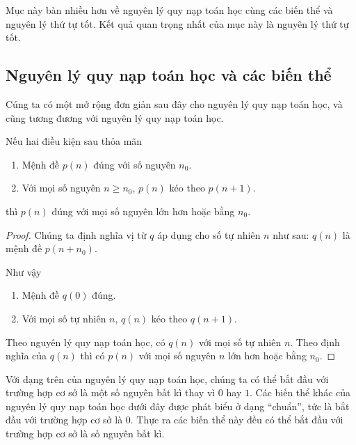 Mục này bàn nhiều hơn về nguyên lý quy nạp toán học cùng các biến thể và nguyên lý thứ tự tốt. Kết quả quan trọng nhất của mục này là nguyên lý thứ tự tốt.

\subsection{Nguyên lý quy nạp toán học và các biến thể}

Cúng ta có một mở rộng đơn giản sau đây cho nguyên lý quy nạp toán học, và cũng tương đương với nguyên lý quy nạp toán học.

\begin{theorem}
    Nếu hai điều kiện sau thỏa mãn
    \begin{enumerate}[label={(\roman*)}]
        \item Mệnh đề $p(n)$ đúng với số nguyên $n_{0}$.
        \item Với mọi số nguyên $n\geq n_{0}$, $p(n)$ kéo theo $p(n + 1)$.
    \end{enumerate}

    thì $p(n)$ đúng với mọi số nguyên lớn hơn hoặc bằng $n_{0}$.
\end{theorem}

\begin{proof}
    Chúng ta định nghĩa vị từ $q$ áp dụng cho số tự nhiên $n$ như sau: $q(n)$ là mệnh đề $p(n + n_{0})$.

    Như vậy
    \begin{enumerate}[label={(\roman*)}]
        \item Mệnh đề $q(0)$ đúng.
        \item Với mọi số tự nhiên $n$, $q(n)$ kéo theo $q(n + 1)$.
    \end{enumerate}

    Theo nguyên lý quy nạp toán học, có $q(n)$ với mọi số tự nhiên $n$. Theo định nghĩa của $q(n)$ thì có $p(n)$ với mọi số nguyên $n$ lớn hơn hoặc bằng $n_{0}$.
\end{proof}

Với dạng trên của nguyên lý quy nạp toán học, chúng ta có thể bắt đầu với trường hợp cơ sở là một số nguyên bất kì thay vì $0$ hay $1$. Các biến thể khác của nguyên lý quy nạp toán học dưới đây được phát biểu ở dạng ``chuẩn'', tức là bắt đầu với trường hợp cơ sở là $0$. Thực ra các biến thể này đều có thể bắt đầu với trường hợp cơ sở là số nguyên bất kì.

